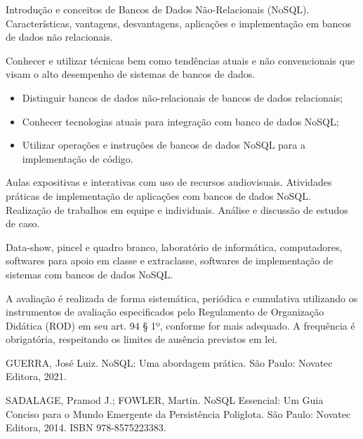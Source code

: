 \begin{pud}

	
	\ementa
	Introdução e conceitos de Bancos de Dados Não-Relacionais (NoSQL).
Características, vantagens, desvantagens, aplicações e implementação em bancos
de dados não relacionais.

	\objetivos
	Conhecer e utilizar técnicas bem como tendências atuais e não convencionais que visam o alto desempenho de sistemas de bancos de dados.
	
	\begin{itemize}
	  \item Distinguir bancos de dados não-relacionais de bancos de dados relacionais;
	  \item Conhecer tecnologias atuais para integração com banco de dados NoSQL;
	  \item Utilizar operações e instruções de bancos de dados NoSQL para a implementação de código.
	\end{itemize}
	
	
	\programa
	
	
	\metodologia
	Aulas expositivas e interativas com uso de recursos audiovisuais. Atividades
práticas de implementação de aplicações com bancos de dados NoSQL. Realização
de trabalhos em equipe e individuais. Análise e discussão de estudos de caso.

	
	\recursos
	Data-show, pincel e quadro branco, laboratório de informática, computadores,
softwares para apoio em classe e extraclasse, softwares de implementação de
sistemas com bancos de dados NoSQL.

	\avaliacao
	A avaliação é realizada de forma sistemática, periódica e cumulativa utilizando os
instrumentos de avaliação especificados pelo Regulamento de Organização
Didática (ROD) em seu art. 94 § 1º, conforme for mais adequado. A frequência é
obrigatória, respeitando os limites de ausência previstos em lei.

	\naopresencial
	
	
	\bibbasica
	\item GUERRA, José Luiz. NoSQL: Uma abordagem prática. São Paulo: Novatec	Editora, 2021.
	
	\item SADALAGE, Pramod J.; FOWLER, Martin. NoSQL Essencial: Um Guia Conciso
	para o Mundo Emergente da Persistência Poliglota. São Paulo: Novatec Editora, 2014. ISBN 978-8575223383.
	

\end{pud}
